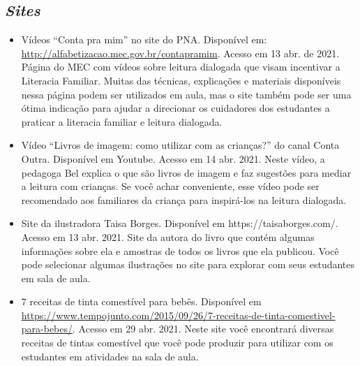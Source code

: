 \documentclass[11pt]{extarticle}
\begin{document}
\subsection{\textit{Sites}}

\begin{itemize}
\item Vídeos “Conta pra mim” no site do PNA. Disponível em: \url{http://alfabetizacao.mec.gov.br/contapramim}. 
Acesso em 13 abr. de 2021.
Página do MEC com vídeos sobre leitura dialogada que visam incentivar a Literacia Familiar. Muitas das 
técnicas, explicações e materiais disponíveis nessa página podem ser utilizados em aula, mas o site também 
pode ser uma ótima indicação para ajudar a direcionar os cuidadores dos estudantes a praticar 
a literacia familiar e leitura dialogada.

\item Vídeo “Livros de imagem: como utilizar com as crianças?” do canal Conta Outra. Disponível em Youtube. 
Acesso em 14 abr. 2021. 
Neste vídeo, a pedagoga Bel explica o que são livros de imagem e faz sugestões para mediar a leitura com 
crianças. Se você achar conveniente, esse vídeo pode ser recomendado aos familiares da criança 
para inspirá-los na leitura dialogada. 

\item Site da ilustradora Taisa Borges. Disponível em https://taisaborges.com/. Acesso em 13 abr. 2021. 
Site da autora do livro que contém algumas informações sobre ela e amostras de todos os livros que ela publicou. 
Você pode selecionar algumas ilustrações no site para explorar com seus estudantes em sala de aula. 

\item 7 receitas de tinta comestível para bebês. 
Disponível em \url{https://www.tempojunto.com/2015/09/26/7-receitas-de-tinta-comestivel-para-bebes/}. 
Acesso em 29 abr. 2021. 
Neste site você encontrará diversas receitas de tintas comestível que você pode produzir 
para utilizar com os estudantes em atividades na sala de aula. 
\end{itemize}
\end{document}
